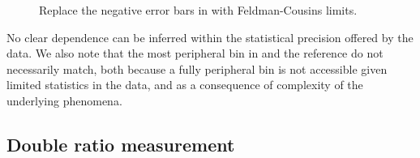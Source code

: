 \begin{figure}[hbtp]
  \begin{center}
	\caption{Replace the negative error bars in  with Feldman-Cousins limits.}
    \label{fig:final_singlerat_centrality_limit}
  \end{center}
\end{figure}


No clear dependence can be inferred within the statistical precision offered by the data. 
We also note that the most peripheral bin in \PbPb and the \pp reference do not necessarily match, both because a fully peripheral bin is not accessible given limited statistics in the data, and  
as a consequence of complexity of the underlying phenomena.  


\subsection{Double ratio measurement}

